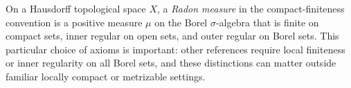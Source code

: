 
On a Hausdorff topological space $X$, a \emph{Radon measure} in the compact-finiteness convention is a positive measure $\mu$ on the Borel $\sigma$-algebra that is finite on compact sets, inner regular on open sets, and outer regular on Borel sets. This particular choice of axioms is important: other references require local finiteness or inner regularity on all Borel sets, and these distinctions can matter outside familiar locally compact or metrizable settings.
